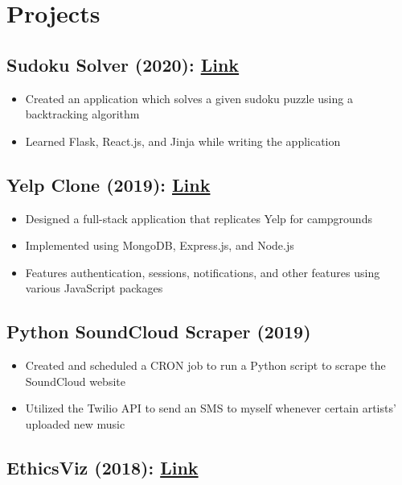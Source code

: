 \documentclass[10pt]{article}
\begin{document}
\section{Projects}
\begin{multicols}{2}

\subsection{Sudoku Solver (2020): \href{https://github.com/brandonhawi/sudokuSolver}{Link}}

\begin{itemize}
	\setlength\itemsep{0em}
	\item Created an application which solves a given sudoku puzzle using a backtracking algorithm
	\item Learned Flask,  React.js,  and Jinja while writing the application
\end{itemize}

\subsection{Yelp Clone (2019): \href{https://github.com/brandonhawi/YelpCamp}{Link}}

\begin{itemize}
	\setlength\itemsep{0em}
	\item Designed a full-stack application that replicates Yelp for campgrounds
	\item Implemented using MongoDB, Express.js, and Node.js
	\item Features authentication, sessions, notifications,  and other features using various JavaScript packages
\end{itemize}

\vfill\null
\columnbreak

\subsection{Python SoundCloud Scraper (2019)}

\begin{itemize}
	\setlength\itemsep{0em}
	\item Created and scheduled a CRON job to run a Python script to scrape the SoundCloud website
	\item Utilized the Twilio API to send an SMS to myself whenever certain artists' uploaded new music
\end{itemize}

\subsection{EthicsViz (2018): \href{https://pervade.umd.edu/}{Link}}


\end{multicols}
\end{document}
